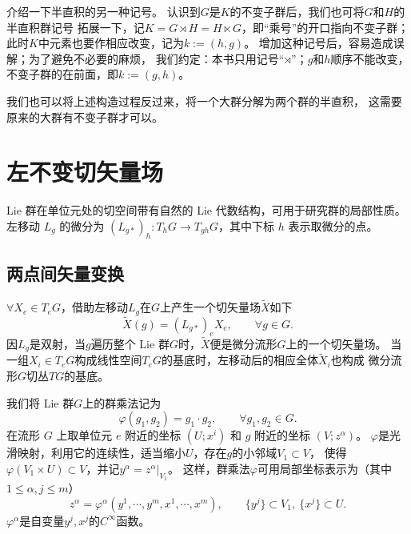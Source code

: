 介绍一下半直积的另一种记号。
认识到$G$是$K$的不变子群后，我们也可将$G$和$H$的{半直积群}记号
拓展一下，记$K=G  \rtimes H =H \ltimes G$，即“乘号”的开口指向不变子群；
此时$K$中元素也要作相应改变，记为$k := (h,g)$。
增加这种记号后，容易造成误解；为了避免不必要的麻烦，
我们约定：本书只用记号“$\rtimes$”；$g$和$h$顺序不能改变，
不变子群的在前面，即$k := (g,h)$。

我们也可以将上述构造过程反过来，将一个大群分解为两个群的半直积，
这需要原来的大群有不变子群才可以。

\section{左不变切矢量场}
Lie 群在单位元处的切空间带有自然的 Lie 代数结构，可用于研究群的局部性质。
左移动 $L_g$ 的微分为 $(L_{g*})_h:T_hG\to T_{gh}G$，其中下标 $h$ 表示取微分的点。

\subsection{两点间矢量变换}
$\forall X_e \in T_e G$，借助左移动$L_g$在$G$上产生一个切矢量场$\widetilde{X}$如下
\begin{equation}
    \widetilde{X}(g) = (L_{g*})_e X_e , \qquad \forall g\in G.
\end{equation}
因$L_g$是双射，当$g$遍历整个 Lie 群$G$时，$\widetilde{X}$便是微分流形$G$上的一个切矢量场。
当一组$X_i\in T_eG$构成线性空间$T_eG$的基底时，左移动后的相应全体$\widetilde{X}_i$也构成
微分流形$G$切丛$TG$的基底。

我们将 Lie 群$G$上的群乘法记为
\begin{equation}
    \varphi(g_1,g_2)=g_1\cdot g_2 , \qquad \forall g_1 , g_2 \in G.
\end{equation}
在流形 $G$ 上取单位元 $e$ 附近的坐标 $(U;x^i)$ 和 $g$ 附近的坐标 $(V;z^\alpha)$。
$\varphi$是光滑映射，利用它的连续性，适当缩小$U$，存在$g$的小邻域$V_1\subset V$，
使得$\varphi(V_1\times U)\subset V$，并记$y^\alpha=z^\alpha|_{V_1}$。
这样，群乘法$\varphi$可用局部坐标表示为（其中$ 1\leqslant \alpha,j \leqslant m$）
\begin{equation}\label{chlg:eqn_z=xy}
    z^\alpha=\varphi^\alpha(y^1,\cdots,y^m, x^1,\cdots,x^m),\qquad
    \{y^j\}\subset V_1,\  \{x^j\}\subset U.
\end{equation}
$\varphi^\alpha$是自变量$y^j,x^j$的$C^\infty$函数。

